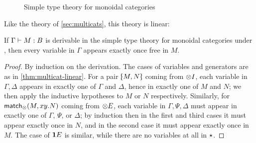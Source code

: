 \begin{figure}
  \centering
  \caption{Simple type theory for monoidal categories}
  \label{fig:moncat}
\end{figure}

Like the theory of \cref{sec:multicats}, this theory is linear:

\begin{lem}\label{thm:moncat-linear}
  If $\Gamma\vdash M:B$ is derivable in the simple type theory for monoidal categories under \cG, then every variable in $\Gamma$ appears exactly once free in $M$.
\end{lem}
\begin{proof}
  By induction on the derivation.
  The cases of variables and generators are as in \cref{thm:multicat-linear}.
  For a pair $\tpair M N$ coming from $\mathord{\otimes}I$, each variable in $\Gamma,\Delta$ appears in exactly one of $\Gamma$ and $\Delta$, hence in exactly one of $M$ and $N$; we then apply the inductive hypotheses to $M$ or $N$ respectively.
  Similarly, for $\mathsf{match}_\otimes(M,xy.N)$ coming from $\mathord{\otimes}E$, each variable in $\Gamma,\Psi,\Delta$ must appear in exactly one of $\Gamma$, $\Psi$, or $\Delta$; by induction then in the first and third cases it must appear exactly once in $N$, and in the second case it must appear exactly once in $M$.
  The case of $\mathbf{1} E$ is similar, while there are no variables at all in $\mathord{\star}$.
\end{proof}

